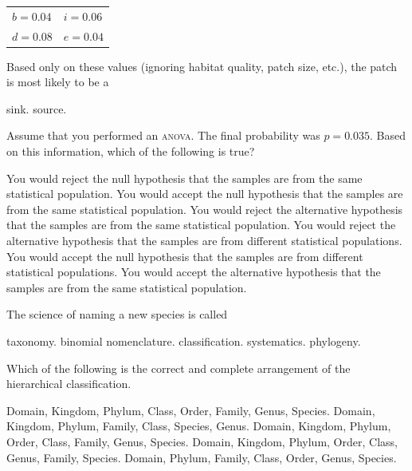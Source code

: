 \qquad\begin{tabular}{@{}ll@{}}
$b = 0.04$ & $i = 0.06$\\
$d = 0.08$ & $e = 0.04$\\
\end{tabular}

Based only on these values (ignoring habitat quality, patch size, etc.), the patch is most likely to be a 

\begin{choices}
\correctchoice  sink.%
\choice  source. %
\end{choices}

\question
Assume that you performed an \textsc{anova}. The final probability was $p = 0.035$. Based on this information, which of the following is true?

\begin{choices}
\correctchoice You would reject the null hypothesis that the samples are from the same statistical population. %
\choice You would accept the null hypothesis that the samples are from the same statistical population. %
\choice You would reject the alternative hypothesis that the samples are from the same statistical population. %
\choice You would reject the alternative hypothesis that the samples are from different statistical populations.
\choice You would accept the null hypothesis that the samples are from different statistical populations. %
\choice You would accept the alternative hypothesis that the samples are from the same statistical population. %
\end{choices}


\question
The science of naming a new species is called

\begin{choices}
\correctchoice  taxonomy. %
\choice binomial nomenclature. %
\choice classification. %
\choice systematics. %
\choice phylogeny. %
\end{choices}

\question
Which of the following is the correct and complete arrangement of the hierarchical classification. 
\begin{choices}
\correctchoice  Domain, Kingdom, Phylum, Class, Order, Family, Genus, Species.%
\choice  Domain, Kingdom, Phylum, Family, Class, Species, Genus.%
\choice  Domain, Kingdom, Phylum, Order, Class, Family, Genus, Species.%
\choice  Domain, Kingdom, Phylum, Order, Class, Genus, Family, Species.%
\choice  Domain, Phylum, Family, Class, Order, Genus, Species.%
\end{choices}


